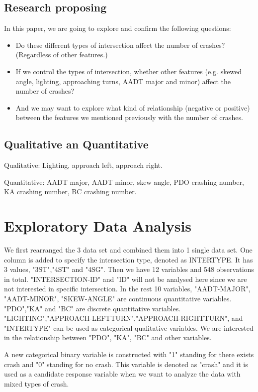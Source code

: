 \documentclass[11pt]{scrartcl} %
\begin{document}
\subsection{Research proposing}

In this paper, we are going to explore and confirm the following questions:

\begin{itemize}
	\item Do these different types of intersection affect the number of crashes? (Regardless of other features.)
	\item If we control the types of intersection, whether other features (e.g. skewed angle, lighting, approaching turns, AADT major and minor) affect the number of crashes? 
	\item And we may want to explore what kind of relationship (negative or positive) between the features we mentioned previously with the number of crashes. 
\end{itemize}

\subsection{Qualitative an Quantitative}

Qualitative: Lighting, approach left, approach right.

Quantitative: AADT major, AADT minor, skew angle, PDO crashing number, KA crashing number, BC crashing number.




\section{Exploratory Data Analysis}
We first rearranged the 3 data set and combined them into 1 single data set. One column is added to specify the intersection type, denoted as INTERTYPE. It has 3 values, "3ST","4ST" and "4SG". Then we have 12 variables and 548 observations in total. "INTERSECTION-ID" and "ID" will not be analysed here since we are not interested in specific intersection. In the rest 10 variables, "AADT-MAJOR", "AADT-MINOR", "SKEW-ANGLE" are continuous quantitative variables. "PDO","KA" and "BC" are discrete  quantitative variables. "LIGHTING","APPROACH-LEFTTURN","APPROACH-RIGHTTURN", and "INTERTYPE" can be used as categorical qualitative variables. We are interested in the relationship between "PDO", "KA", "BC" and other variables.

A new categorical binary variable is constructed with "1" standing for there exists crash and "0" standing for no crash. This variable is denoted as "crash" and it is used as a candidate response variable when we want to analyze the data with mixed types of crash.
\end{document}

